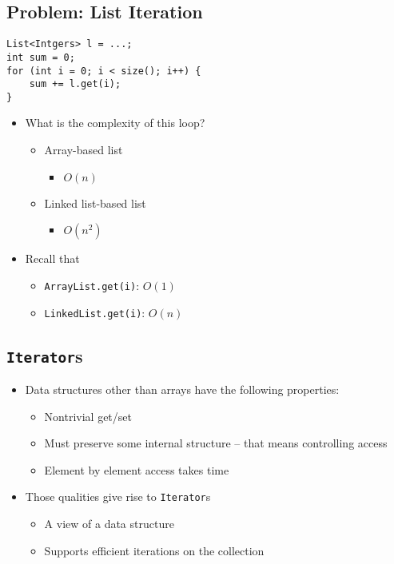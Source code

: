 \documentclass[10pt]{article}
\begin{document}
\subsection*{Problem: List Iteration}
\begin{verbatim}
List<Intgers> l = ...;
int sum = 0;
for (int i = 0; i < size(); i++) {
    sum += l.get(i);
}
\end{verbatim}
\begin{itemize}
    \item What is the complexity of this loop?
    \begin{itemize}
        \item Array-based list
        \begin{itemize}
            \item $O(n)$
        \end{itemize}
        \item Linked list-based list
        \begin{itemize}
            \item $O(n^2)$
        \end{itemize}
    \end{itemize}
    \item Recall that
    \begin{itemize}
        \item \texttt{ArrayList.get(i)}: $O(1)$
        \item \texttt{LinkedList.get(i)}: $O(n)$
    \end{itemize}
\end{itemize}

\subsection*{\texttt{Iterator}s}
\begin{itemize}
    \item Data structures other than arrays have the following properties:
    \begin{itemize}
        \item Nontrivial get/set
        \item Must preserve some internal structure -- that means controlling access
        \item Element by element access takes time
    \end{itemize}
    \item Those qualities give rise to \texttt{Iterator}s
    \begin{itemize}
        \item A view of a data structure
        \item Supports efficient iterations on the collection
    \end{itemize}
\end{itemize}
\end{document}
